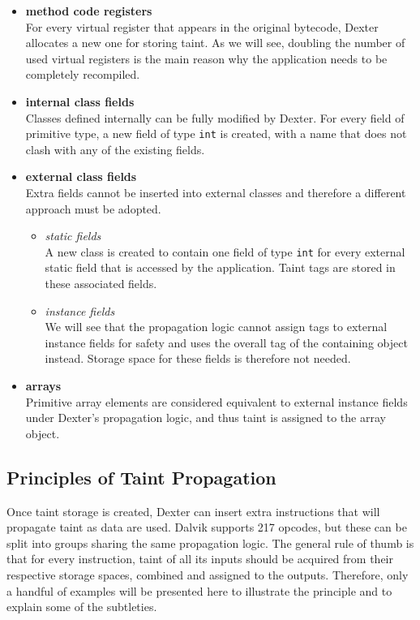 \documentclass[12pt,twoside,notitlepage]{report}
\begin{document}
\begin{itemize}

\item \textbf{method code registers} \\
For every virtual register that appears in the original bytecode, Dexter allocates a new one for storing taint. As we will see, doubling the number of used virtual registers is the main reason why the application needs to be completely recompiled.

\item \textbf{internal class fields} \\
Classes defined internally can be fully modified by Dexter. For every field of primitive type, a new field of type \verb$int$ is created, with a name that does not clash with any of the existing fields.

\item \textbf{external class fields} \\
Extra fields cannot be inserted into external classes and therefore a different approach must be adopted. 
\begin{itemize}
\item \textit{static fields} \\
A new class is created to contain one field of type \verb$int$ for every external static field that is accessed by the application. Taint tags are stored in these associated fields.

\item \textit{instance fields} \\
We will see that the propagation logic cannot assign tags to external instance fields for safety and uses the overall tag of the containing object instead. Storage space for these fields is therefore not needed.

\end{itemize}

\item \textbf{arrays} \\
Primitive array elements are considered equivalent to external instance fields under Dexter's propagation logic, and thus taint is assigned to the array object.

\end{itemize}

\subsection{Principles of Taint Propagation}

Once taint storage is created, Dexter can insert extra instructions that will propagate taint as data are used. Dalvik supports 217 opcodes, but these can be split into groups sharing the same propagation logic. The general rule of thumb is that for every instruction, taint of all its inputs should be acquired from their respective storage spaces, combined and assigned to the outputs. Therefore, only a handful of examples will be presented here to illustrate the principle and to explain some of the subtleties.
\end{document}
